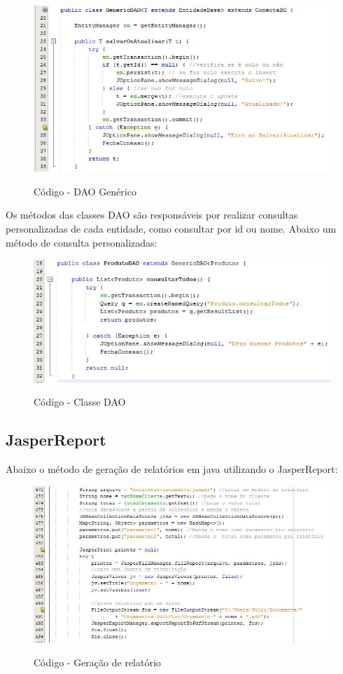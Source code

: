   
 \begin{figure}[H]
\centering
\caption{Código - DAO Genérico}
\includegraphics[width=12cm]{imagens/codigo/TrechoGenericDao}
\label{fig:Dao Genérico}
\end{figure}
   
   Os métodos das classes DAO são responsáveis por realizar consultas personalizadas de cada entidade, como consultar por id ou nome. Abaixo um método de consulta personalizadas:
   
 \begin{figure}[H]
\centering
\caption{Código - Classe DAO}
\includegraphics[width=15cm]{imagens/codigo/TrechoDao}
\label{fig:Classe DAO}
\end{figure}
    
    \subsection{JasperReport}
    Abaixo o método de geração de relatórios em java utilizando o JasperReport:
    
\begin{figure}[h]
\centering
\caption{Código - Geração de relatório}
\includegraphics[width=15cm]{imagens/codigo/TrechoJasper}
\label{fig:Método Relatório}
\end{figure}
    
